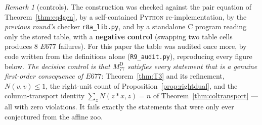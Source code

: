 \documentclass[11pt]{article}
\theoremstyle{plain}
\theoremstyle{definition}
\theoremstyle{remark}
\newtheorem*{remark*}{Remark}
\numberwithin{equation}{section}
\newcommand{\op}{\mathbin{*}}
\begin{document}
\begin{remark*}[controls]
The construction was checked against the pair equation of Theorem~\ref{thm:eq4gen}, by a
self-contained \textsc{Python} re-implementation, by the \emph{previous round's} checker
\texttt{r8a\_lib.py}, and by a standalone \textsc{C} program reading only the stored table,
with a \textbf{negative control} (swapping two table cells produces $8$ $E677$ failures).
For this paper the table was audited once more, by code written from the
definitions alone (\texttt{R9\_audit.py}), reproducing every figure below.
\emph{The decisive control is that $M_{77}^{\mathrm{D}}$ satisfies every statement
that is a genuine first-order consequence of $E677$}: Theorem~\ref{thm:T3} and its
refinement, $N(v,v)\le1$, the right-unit count of
Proposition~\ref{prop:rightdual}, and the column-transport identity
$\sum_zN(z\op x,z) = n$ of Theorem~\ref{thm:coltransport} --- all with zero
violations. It fails exactly the statements that were only ever conjectured from
the affine zoo.
\end{remark*}
\end{document}
